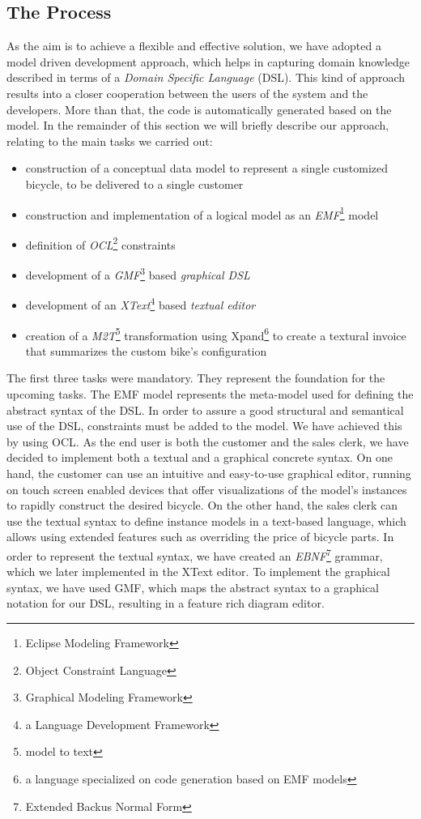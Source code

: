 \subsection{The Process}
\noindent As the aim is to achieve a flexible and effective solution, we have
adopted a model driven development approach, which helps in capturing domain
knowledge described in terms of a \emph{Domain Specific Language} (DSL). This
kind of approach results into a closer cooperation between the users of the
system and the developers. More than that, the code is automatically generated
based on the model. In the remainder of this section we will briefly describe
our approach, relating to the main tasks we carried out:
\begin{itemize}
  \item construction of a conceptual data model to represent a single customized
  bicycle, to be delivered to a single customer
  \item construction and implementation of a logical model as an
  \emph{EMF}\footnote{Eclipse Modeling Framework} model
  \item definition of \emph{OCL}\footnote{Object Constraint Language}
  constraints
  \item development of a \emph{GMF}\footnote{Graphical Modeling Framework} based
  \emph{graphical DSL}
  \item development of an \emph{XText}\footnote{a Language Development
  Framework} based \emph{textual editor}
  \item creation of a \emph{M2T}\footnote{model to text} transformation using
  Xpand\footnote{a language specialized on code generation based on EMF models}
  to create a textural invoice that summarizes the custom bike's configuration
\end{itemize} 

\noindent The first three tasks were mandatory. They represent the foundation
for the upcoming tasks. The EMF model represents the meta-model used for
defining the abstract syntax of the DSL. In order to assure a good structural
and semantical use of the DSL, constraints must be added to the model. We have
achieved this by using OCL. As the end user is both the customer and the sales
clerk, we have decided to implement both a textual and a graphical concrete syntax. On
one hand, the customer can use an intuitive and easy-to-use graphical
editor, running on touch screen enabled devices that offer visualizations
of the model's instances to rapidly construct the desired bicycle. On the other
hand, the sales clerk can use the textual syntax to define instance models in a
text-based language, which allows using extended features such as overriding
the price of bicycle parts. In order to represent the textual syntax, we have
created an \emph{EBNF}\footnote{Extended Backus Normal Form} grammar, which we later 
implemented in the XText editor. To implement the graphical syntax, we have used GMF, 
which maps the abstract syntax to a graphical notation for our DSL, resulting in
a feature rich diagram editor.\\

